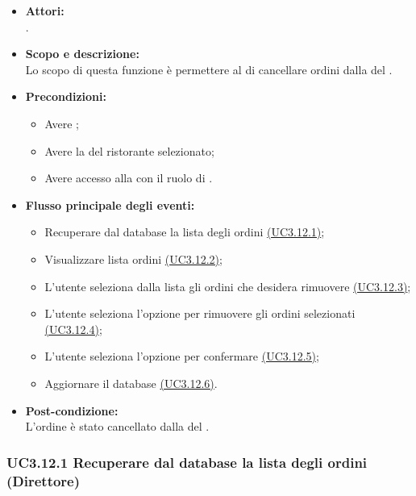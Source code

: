 \begin{itemize}
	\item \textbf{Attori:}
	\\.
	\item \textbf{Scopo e descrizione:} 
	\\Lo scopo di questa funzione è permettere al  di cancellare ordini dalla  del .
	\item \textbf{Precondizioni:}
	\begin{itemize}
		\item Avere ;
		\item Avere la  del ristorante selezionato;
		\item Avere accesso alla  con il ruolo di .
	\end{itemize}
	\item \textbf{Flusso principale degli eventi:}
	\begin{itemize}
		\item Recuperare dal database la lista degli ordini \hyperref[UC3.12.1]{(UC3.12.1)};
		\item Visualizzare lista ordini \hyperref[UC3.12.2]{(UC3.12.2)};
		\item L'utente  seleziona dalla lista gli ordini che desidera rimuovere \hyperref[UC3.12.3]{(UC3.12.3)};
		\item L'utente  seleziona l'opzione per rimuovere gli ordini selezionati \hyperref[UC3.12.4]{(UC3.12.4)};
		\item L'utente  seleziona l'opzione per confermare \hyperref[UC3.12.5]{(UC3.12.5)};
		\item Aggiornare il database \hyperref[UC3.12.6]{(UC3.12.6)}.
	\end{itemize}
	\item \textbf{Post-condizione:}
	\\L'ordine è stato cancellato dalla  del .
\end{itemize}

\subsubsection{UC3.12.1 Recuperare dal database la lista degli ordini (Direttore)} \label{UC3.12.1}

